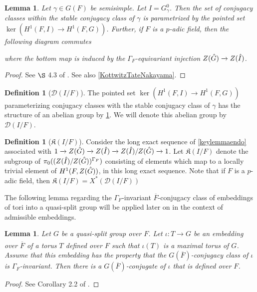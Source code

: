 \documentclass[11pt,a4paper]{article}
\theoremstyle{definition}
\newtheorem{D}[shared]{Definition}
\theoremstyle{plain}
\newtheorem{Le}[shared]{Lemma}
\theoremstyle{remark}
\theoremstyle{plain}
\begin{document}
\begin{Le}\label{conjclassinsidestable}
    Let $\gamma \in G(F)$ be semisimple. Let $I = G_{\gamma}^0$. Then the set of conjugacy classes within the stable conjugacy class of $\gamma$ is parametrized by the pointed set $\ker(H^1(F,I) \xrightarrow[]{} H^1(F,G))$. Further, if $F$ is a $p$-adic field, then the following diagram commutes
    \begin{center}
    \end{center}
    where the bottom map is induced by the $\Gamma_F$-equivariant injection $Z(\Hat{G}) \xrightarrow[]{} Z(\Hat{I})$.
\end{Le}
\begin{proof}
    See $\S$ 4.3 of \cite{MR858284}. See also \ref{KottwitzTateNakayama}.
\end{proof}

\begin{D}[$\mathcal{D}(I/F)$]
    The pointed set $\ker(H^1(F,I) \xrightarrow[]{} H^1(F,G))$ parameterizing conjugacy classes with the stable conjugacy class of $\gamma$ has the structure of an abelian group by \ref{conjclassinsidestable}. We will denote this abelian group by $\mathcal{D}(I/F)$.
\end{D}

\begin{D}[$\mathfrak{K}(I/F)$]\label{kappadef}
    Consider the long exact sequence of \ref{keylemmaendo} associated with $1 \xrightarrow[]{} Z(\Hat{G}) \xrightarrow[]{} Z(\Hat{I}) \xrightarrow[]{} Z(\Hat{I}) / Z(\Hat{G}) \xrightarrow[]{} 1$. Let $\mathfrak{K}(I/F)$ denote the subgroup of $\pi_0((Z(\Hat{I})/Z(\Hat{G}))^{\Gamma_F})$ consisting of elements which map to a locally trivial element of $H^1(F, Z(\Hat{G}))$, in this long exact sequence. Note that if $F$ is a $p$-adic field, then $\mathfrak{K}(I/F) =X^*(\mathcal{D}(I/F))$
\end{D}

The following lemma regarding the $\Gamma_F$-invariant $\overline{F}$-conjugacy class of embeddings of tori into a quasi-split group will be applied later on in the context of admissible embeddings.

\begin{Le}\label{quasisplitlemma}
    Let $G$ be a quasi-split group over $F$. Let $\iota: T \xrightarrow[]{} G$ be an embedding over $\overline{F}$ of a torus $T$ defined over $F$ such that $\iota(T)$ is a maximal torus of $G$. Assume that this embedding has the property that the $G(\overline{F})$-conjugacy class of $\iota$ is $\Gamma_F$-invariant. Then there is a $G(\overline{F})$-conjugate of $\iota$ that is defined over $F$.
\end{Le}
\begin{proof}
    See Corollary 2.2 of \cite{MR683003}.
\end{proof}
\end{document}

